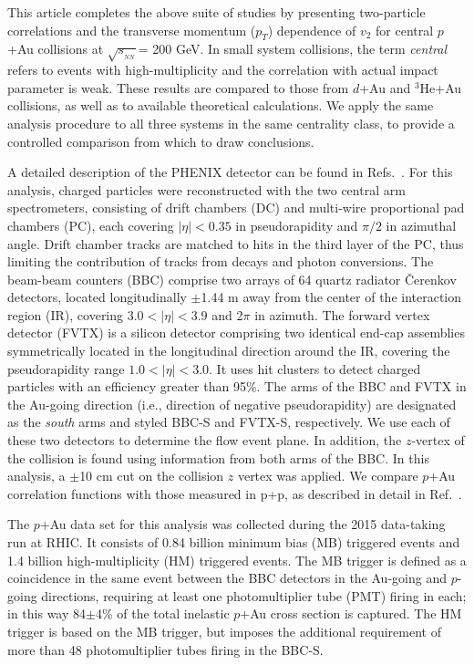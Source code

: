 \documentclass[%
reprint,
showpacs,preprintnumbers,
 amsmath,amssymb,
 aps,
]{revtex4-1}
\newcommand{\pt}{\mbox{$p_T$}\xspace}
\newcommand{\sqsn}{\mbox{$\sqrt{s_{_{NN}}}$}\xspace}
\newcommand{\dau}{\mbox{$d$+Au}\xspace}
\newcommand{\pau}{\mbox{$p$+Au}\xspace}
\newcommand{\hau}{\mbox{$^3\text{He}$+Au}\xspace}
\newcommand{\bbceta}{\mbox{$3.0<|\eta|<3.9$}\xspace}
\begin{document}
This article completes the above suite of studies by presenting two-particle correlations and the transverse momentum (\pt) dependence of $v_2$ for central \pau collisions at \sqsn = 200 GeV. In small system collisions, the term \emph{central} refers to events with high-multiplicity and the correlation with actual impact parameter is weak. These results are compared to those from \dau and \hau collisions, as well as to available theoretical calculations. We apply the same analysis procedure to all three systems in the same centrality class, to provide a controlled comparison from which to draw conclusions.

A detailed description of the PHENIX detector can be found in Refs.~\cite{Adcox2003469,fvtx}. For this analysis, charged particles were reconstructed with the two central arm spectrometers, consisting of drift chambers (DC) and multi-wire proportional pad chambers (PC), each covering $|\eta|<0.35$ in pseudorapidity and $\pi/2$ in azimuthal angle. Drift chamber tracks are matched to hits in the third layer of the PC, thus limiting the contribution of tracks from decays and photon conversions. The beam-beam counters (BBC) comprise two arrays of 64 quartz radiator \v{C}erenkov detectors, located longitudinally $\pm$1.44 m away from the center of the interaction region (IR), covering \bbceta and 2$\pi$ in azimuth. The forward vertex detector (FVTX) is a silicon detector comprising two identical end-cap assemblies symmetrically located in the longitudinal direction around the IR, covering the pseudorapidity range $1.0 < |\eta| < 3.0$. It uses hit clusters to detect charged particles with an efficiency greater than 95\%.
The arms of the BBC and FVTX in the Au-going direction (i.e., direction of negative pseudorapidity) are designated as the \emph{south} arms and styled BBC-S and FVTX-S, respectively. We use each of these two detectors to determine the flow event plane. In addition, the $z$-vertex of the collision is found using information from both arms of the BBC. In this analysis, a $\pm$10 cm cut on the collision $z$ vertex was applied. We compare \pau correlation functions with those measured in p+p, as described in detail in Ref.~\cite{Adare:2015ctn}.

The \pau data set for this analysis was collected during the 2015 data-taking run at RHIC. It consists of 0.84 billion minimum bias (MB) triggered events and 1.4 billion high-multiplicity (HM) triggered events. The MB trigger is defined as a coincidence in the same event between the BBC detectors in the Au-going and $p$-going directions, requiring at least one photomultiplier tube (PMT) firing in each; in this way 84$\pm$4\% of the total inelastic \pau cross section is captured. The HM trigger is based on the MB trigger, but imposes the additional requirement of more than 48 photomultiplier tubes firing in the BBC-S. 
\end{document}
